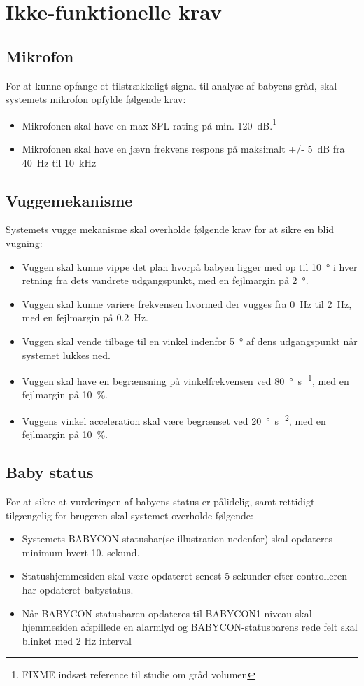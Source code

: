 \section{Ikke-funktionelle krav}

\subsection*{Mikrofon}
For at kunne opfange et tilstrækkeligt signal til analyse af babyens gråd, skal systemets mikrofon opfylde følgende krav:
\begin{itemize}
\item Mikrofonen skal have en max SPL rating på min. \SI{120}{\dB}.\footnote{FIXME indsæt reference til studie om gråd volumen}
\item Mikrofonen skal have en jævn frekvens respons på maksimalt +/- \SI{5}{\dB} fra \SI{40}{\hertz} til \SI{10}{\kilo\hertz}
\end{itemize}

\subsection*{Vuggemekanisme}

Systemets vugge mekanisme skal overholde følgende krav for at sikre en blid vugning:
\begin{itemize}
\item Vuggen skal kunne vippe det plan hvorpå babyen ligger med op til \SI{10}{\degree} i hver retning fra dets vandrete udgangspunkt, med en fejlmargin på \SI{2}{\degree}.
\item Vuggen skal kunne variere frekvensen hvormed der vugges fra \SI{0}{\hertz} til \SI{2}{\hertz}, med en fejlmargin på \SI{0.2}{\hertz}.
\item Vuggen skal vende tilbage til en vinkel indenfor \SI{5}{\degree} af dens udgangspunkt når systemet lukkes ned.
\item Vuggen skal have en begrænsning på vinkelfrekvensen ved \SI{80}{\degree\per\second}, med en fejlmargin på \SI{10}{\percent}.
\item Vuggens vinkel acceleration skal være begrænset ved \SI{20}{\degree\per\square\second}, med en fejlmargin på \SI{10}{\percent}.
\end{itemize}

\subsection*{Baby status}
For at sikre at vurderingen af babyens status er pålidelig, samt rettidigt tilgængelig for brugeren skal systemet overholde følgende:
\begin{itemize}
\item Systemets BABYCON-statusbar(se illustration nedenfor) skal opdateres minimum hvert 10. sekund.
\item Statushjemmesiden skal være opdateret senest 5 sekunder efter controlleren har opdateret babystatus.
\item Når BABYCON-statusbaren opdateres til BABYCON1 niveau skal hjemmesiden afspillede en alarmlyd og BABYCON-statusbarens røde felt skal blinket med 2 Hz interval
\end{itemize}
